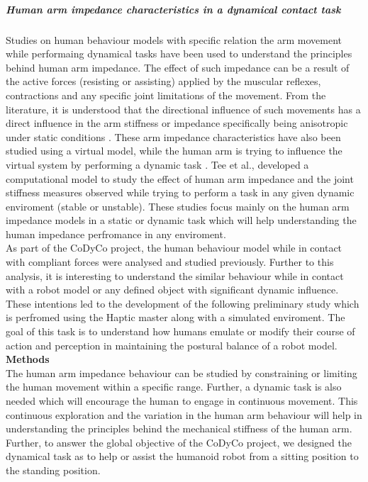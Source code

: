 \subparagraph*{Human arm impedance characteristics in a dynamical contact task}
Studies on human behaviour models with specific relation the arm movement while performaing dynamical tasks have been used to understand the principles behind human arm impedance\cite{Darainy, Mussa-Ivaldi}. The effect of such impedance can be a result of the active forces (resisting or assisting) applied by the muscular reflexes, contractions and any specific joint limitations of the movement. From the literature, it is understood that the directional influence of such movements has a direct influence in the arm stiffness or impedance specifically being anisotropic under static conditions \cite{Burdet2001}. These arm impedance characteristics have also been studied using a virtual model, while the human arm is trying to influence the virtual system by performing a dynamic task \cite{Tsuji2004}. Tee et al.,\cite{tee2004} developed a computational model to study the effect of human arm impedance and the joint stiffness measures observed while trying to perform a task in any given dynamic enviroment (stable or unstable). These studies focus mainly on the human arm impedance models in a static or dynamic task which will help understanding the human impedance perfromance in any enviroment. \\

As part of the CoDyCo project, the human behaviour model while in contact with compliant forces were analysed and studied previously. Further to this analysis, it is interesting to understand the similar behaviour while in contact with a robot model or any defined object with significant dynamic influence. These intentions led to the development of the following preliminary study which is perfromed using the Haptic master along with a simulated enviroment. The goal of this task is to understand how humans emulate or modify their course of action and perception in maintaining the postural balance of a robot model.  \\

\textbf{Methods}\\
The human arm impedance behaviour can be studied by constraining or limiting the human movement within a specific range. Further, a dynamic task is also needed which will encourage the human to engage in continuous movement. This continuous exploration and the variation in the human arm behaviour will help in understanding the principles behind the mechanical stiffness of the human arm. Further, to answer the global objective of the CoDyCo project, we designed the dynamical task as to help or assist the humanoid robot from a sitting position to the standing position. 

